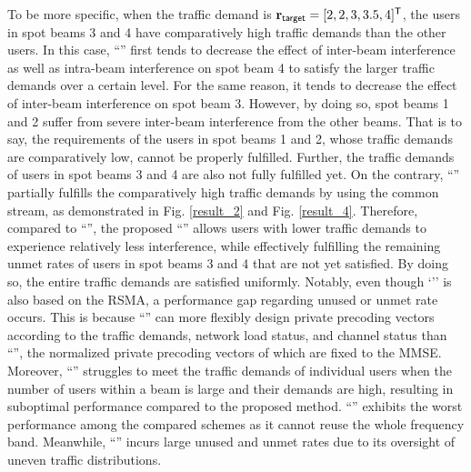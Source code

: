 \documentclass[draftclsnofoot, onecolumn, comsoc, 12pt]{IEEEtran}
\begin{document}
{To be more specific, when the traffic demand is $\mathbf{r}_{\sf{target}}=[2, 2, 3, 3.5, 4]^{\sf{T}}$, the users in spot beams 3 and 4 have comparatively high traffic demands than the other users.} In this case, ``{}'' first tends to decrease the effect of inter-beam interference as well as intra-beam interference on spot beam 4 to satisfy the larger traffic demands over a certain level. 
For the same reason, it tends to decrease the effect of inter-beam interference on spot beam 3. 
However, by doing so, spot beams 1 and 2 suffer from severe inter-beam interference from the other beams. 
That is to say, the requirements of the users in spot beams 1 and 2, whose traffic demands are comparatively low, cannot be properly fulfilled. 
Further, the traffic demands of users in spot beams 3 and 4 are also not fully fulfilled yet.
On the contrary, ``{}'' partially fulfills the comparatively high traffic demands by using the common stream, as demonstrated in Fig. \ref{result_2} and  Fig. \ref{result_4}.
{Therefore, compared to ``{}'', the proposed ``{}'' allows users with lower traffic demands to experience relatively less interference, while effectively fulfilling the remaining unmet rates of users in spot beams 3 and 4 that are not yet satisfied.
By doing so, the entire traffic demands are satisfied uniformly.}
Notably, even though `{}'' is also based on the RSMA, a performance gap regarding {unused} or {unmet rate} occurs. This is because ``{}'' can more flexibly design private precoding vectors according to the traffic demands, network load status, and channel status than ``{}'', the normalized private precoding vectors of which are fixed to the MMSE. 
{Moreover, ``{}'' struggles to meet the traffic demands of individual users when the number of users within a beam is large and their demands are high, resulting in suboptimal performance compared to the proposed method.}
``{}'' exhibits the worst performance among the compared schemes as it cannot reuse the whole frequency band. 
Meanwhile, ``{}'' incurs large {unused} and {unmet rates} due to its oversight of uneven traffic distributions.
\end{document}
